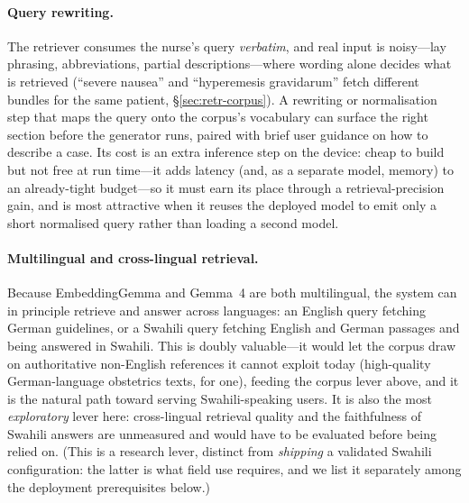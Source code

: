 \paragraph{Query rewriting.} The retriever consumes the nurse's query
\emph{verbatim}, and real input is noisy---lay phrasing, abbreviations, partial
descriptions---where wording alone decides what is retrieved (``severe nausea''
and ``hyperemesis gravidarum'' fetch different bundles for the same patient,
\S\ref{sec:retr-corpus}). A rewriting or normalisation step that maps the query
onto the corpus's vocabulary can surface the right section before the generator
runs, paired with brief user guidance on how to describe a case. Its cost is an
extra inference step on the device: cheap to build but not free at run time---it
adds latency (and, as a separate model, memory) to an already-tight budget---so
it must earn its place through a retrieval-precision gain, and is most attractive
when it reuses the deployed model to emit only a short normalised query rather
than loading a second model.

\paragraph{Multilingual and cross-lingual retrieval.} Because EmbeddingGemma and
Gemma~4 are both multilingual, the system can in principle retrieve and answer
across languages: an English query fetching German guidelines, or a Swahili query
fetching English and German passages and being answered in Swahili. This is
doubly valuable---it would let the corpus draw on authoritative non-English
references it cannot exploit today (high-quality German-language obstetrics
texts, for one), feeding the corpus lever above, and it is the natural path
toward serving Swahili-speaking users. It is also the most \emph{exploratory}
lever here: cross-lingual retrieval quality and the faithfulness of Swahili
answers are unmeasured and would have to be evaluated before being relied on.
(This is a research lever, distinct from \emph{shipping} a validated Swahili
configuration: the latter is what field use requires, and we list it separately
among the deployment prerequisites below.)

